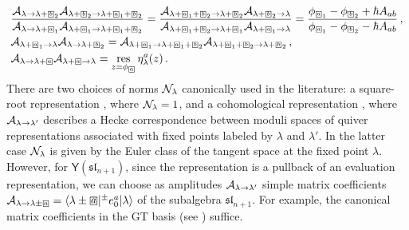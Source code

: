 \documentclass[10pt]{article}
\theoremstyle{definition}
\def\CA{{\cal A}}
\def\CN {{\cal N}}
\def\fl{\mathfrak{l}}
\def\fs{\mathfrak{s}}
\def\fs{\mathfrak{s}}
\def\myY{{\mathsf{Y}}}
\def\lm{\limits}
\numberwithin{equation}{section}
\newcommand\sqbox[1]{{
		\setbox0=\hbox{\mbox{$\Box$}}
		\setbox1=\hbox{\mbox{\raisebox{0.35ex}{\small #1}}}
		\mbox{\raisebox{-0.2ex}{\rlap{\hbox to \wd0{\hss{\box1}\hss}}\box0}}
}}
\newcommand\ssqbox[1]{{
		\setbox0=\hbox{\mbox{$\scriptstyle\Box$}}
		\setbox1=\hbox{\mbox{\raisebox{0.35ex}{\tiny #1}}}
		\mbox{\raisebox{-0.2ex}{\rlap{\hbox to \wd0{\hss{\box1}\hss}}\box0}}
}}
\begin{document}
\begin{equation}\label{hysteresis}
	\begin{aligned}
		&\frac{\CA_{\lambda\to\lambda+\ssqbox{$b$}_2}\CA_{\lambda+\ssqbox{$b$}_2\to\lambda+\ssqbox{$a$}_1+\ssqbox{$b$}_2}}{\CA_{\lambda\to\lambda+\ssqbox{$a$}_1}\CA_{\lambda+\ssqbox{$a$}_1\to\lambda+\ssqbox{$a$}_1+\ssqbox{$b$}_2}}=\frac{\CA_{\lambda+\ssqbox{$a$}_1+\ssqbox{$b$}_2\to\lambda+\ssqbox{$b$}_2}\CA_{\lambda+\ssqbox{$b$}_2\to\lambda}}{\CA_{\lambda+\ssqbox{$a$}_1+\ssqbox{$b$}_2\to\lambda+\ssqbox{$a$}_1}\CA_{\lambda+\ssqbox{$a$}_1\to\lambda}}=\frac{\phi_{\ssqbox{$a$}_1}-\phi_{\ssqbox{$b$}_2}+\hbar A_{ab}}{\phi_{\ssqbox{$a$}_1}-\phi_{\ssqbox{$b$}_2}-\hbar A_{ab}}\,,\\
		&\CA_{\lambda+\ssqbox{$a$}_1\to\lambda}\CA_{\lambda\to\lambda+\ssqbox{$b$}_2}=\CA_{\lambda+\ssqbox{$a$}_1\to\lambda+\ssqbox{$a$}_1+\ssqbox{$b$}_2}\CA_{\lambda+\ssqbox{$a$}_1+\ssqbox{$b$}_2\to\lambda+\ssqbox{$b$}_2}\,,\\
		&\CA_{\lambda\to\lambda+\ssqbox{$a$}}\CA_{\lambda+\ssqbox{$a$}\to\lambda}=\mathop{\rm res}\lm_{z=\phi_{\ssqbox{$a$}}}\eta_{\lambda}^a(z)\,.
	\end{aligned}
\end{equation}
There are two choices of norms $\CN_\lambda$ canonically used in the literature: a square-root representation \cite{Prochazka:2015deb,Li:2020rij}, where $\CN_{\lambda}=1$, and a cohomological representation \cite{Nakajima1998,Rapcak:2018nsl,Rapcak:2020ueh,Galakhov:2020vyb}, where $\CA_{\lambda\to\lambda'}$ describes a Hecke correspondence between moduli spaces of quiver representations associated with fixed points labeled by $\lambda$ and $\lambda'$.
In the latter case $\CN_{\lambda}$ is given by the Euler class of the tangent space at the fixed point $\lambda$.
However, for $\myY(\fs\fl_{n+1})$, since the representation is a pullback of an evaluation representation, we can choose as amplitudes $\CA_{\lambda\to\lambda'}$ simple matrix coefficients $\CA_{\lambda\to\lambda\pm\ssqbox{$a$}}=\langle \lambda\pm\sqbox{$a$}|{}^{\pm}e_0^a|\lambda\rangle$ of the subalgebra $\fs\fl_{n+1}$.
For example, the canonical matrix coefficients in the GT basis (see \cite[Th.~2.3]{molev2006gelfand}) suffice.

\end{document}
